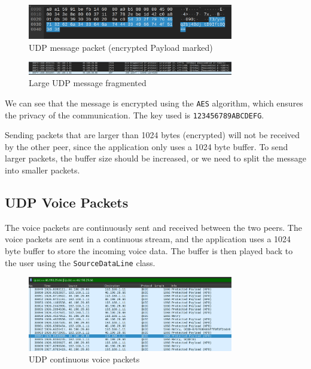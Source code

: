 \documentclass{article}
\begin{document}
\begin{figure}[h]
    \centering
    \includegraphics[width=0.8\textwidth]{udp-messages-3.png}
    \caption{UDP message packet (encrypted Payload marked)}
    \label{fig:udp-messages-3}
\end{figure}

\begin{figure}[h]
    \centering
    \includegraphics[width=0.8\textwidth]{udp-messages-fragmented.png}
    \caption{Large UDP message fragmented}
    \label{fig:udp-messages-4}
\end{figure}

We can see that the message is encrypted using the \texttt{AES} algorithm, which ensures the privacy of the communication.
The key used is \texttt{123456789ABCDEFG}.

Sending packets that are larger than 1024 bytes (encrypted) will not be received by the other peer, since the application only
uses a 1024 byte buffer. To send larger packets, the buffer size should be increased, or we need to split the message into smaller packets.




\subsection{UDP Voice Packets}

The voice packets are continuously sent and received between the two peers. The voice packets are sent in a continuous stream,
and the application uses a 1024 byte buffer to store the incoming voice data. The buffer is then played back to the user using the
\texttt{SourceDataLine} class.

\begin{figure}[h]
    \centering
    \includegraphics[width=0.8\textwidth]{udp-voice-1.png}
    \caption{UDP continuous voice packets}
    \label{fig:udp-voice-1}
\end{figure}
\end{document}
